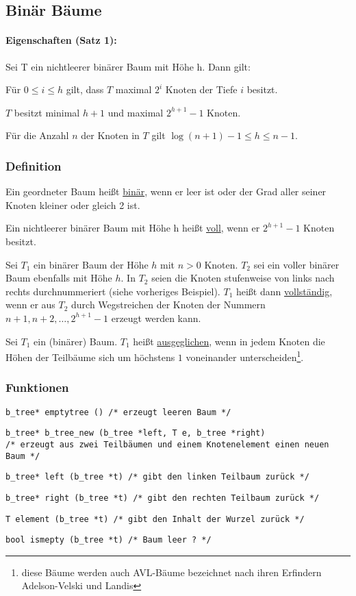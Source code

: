 \subsection{Binär Bäume}
\paragraph{Eigenschaften (Satz 1):} Sei T ein nichtleerer binärer Baum mit Höhe h. Dann gilt:
\begin{compactenum}
	\item  Für $0 \le i \le h$ gilt, dass $T$ maximal $2^i$ Knoten der Tiefe $i$ besitzt.
	\item $T$ besitzt minimal $h + 1$ und maximal $2^{h+1} − 1$ Knoten.
	\item Für die Anzahl $n$ der Knoten in $T$ gilt $\log(n + 1) − 1 \le h \le n − 1$.
\end{compactenum}

\subsubsection{Definition}
Ein geordneter Baum heißt \ul{binär}, wenn er leer ist oder der Grad aller seiner Knoten kleiner oder gleich 2 ist.

Ein nichtleerer binärer Baum mit Höhe h heißt \ul{voll}, wenn er $2^{h+1} − 1$ Knoten besitzt.

Sei $T_1$ ein binärer Baum der Höhe $h$ mit $n > 0$ Knoten. $T_2$ sei ein voller binärer Baum ebenfalls mit Höhe $h$. In $T_2$ seien die Knoten stufenweise von links nach rechts durchnummeriert (siehe vorheriges Beispiel). $T_1$ heißt dann \ul{vollständig}, wenn er aus $T_2$ durch Wegstreichen der Knoten der Nummern $n+1, n+2, \ldots, 2^{h+1}−1$ erzeugt werden kann.

Sei $T_1$ ein (binärer) Baum. $T_1$ heißt \ul{ausgeglichen}, wenn in jedem Knoten die Höhen der Teilbäume sich um höchstens $1$ voneinander unterscheiden\footnote{diese Bäume werden auch AVL-Bäume bezeichnet nach ihren Erfindern Adelson-Velski und Landis}.

\subsubsection{Funktionen}
\begin{compactitem}
	\item \verb|b_tree* emptytree () /* erzeugt leeren Baum */|
	\item \verb|b_tree* b_tree_new (b_tree *left, T e, b_tree *right)|\\
	\verb|/* erzeugt aus zwei Teilbäumen und einem Knotenelement einen neuen Baum */|
	\item \verb|b_tree* left (b_tree *t) /* gibt den linken Teilbaum zurück */|
	\item \verb|b_tree* right (b_tree *t) /* gibt den rechten Teilbaum zurück */|\\
	\item \verb|T element (b_tree *t) /* gibt den Inhalt der Wurzel zurück */|
	\item \verb|bool ismepty (b_tree *t) /* Baum leer ? */|
\end{compactitem}

